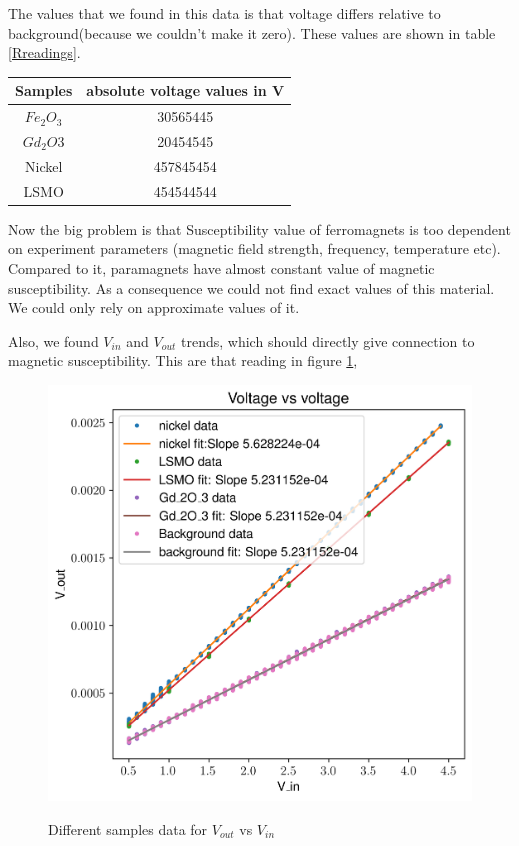 The values that we found in this data is that voltage differs relative to background(because we couldn’t make it zero). These values are shown in table \ref{Rreadings}.

\noindent\setlength\tabcolsep{4pt}%
\begin{tabularx}{\linewidth}{c|c}
  \hline
  \hline
  Samples & absolute voltage values in V \\
  \hline
  $Fe_2O_3$ & 30565445 \\
  $Gd_2O3$ & 20454545 \\
  Nickel & 457845454 \\
LSMO & 454544544 \\
\hline
\hline
\end{tabularx}
\label{Rreadings}
\vskip1cm

Now the big problem is that Susceptibility value of ferromagnets is too dependent on experiment parameters (magnetic field strength, frequency, temperature etc). Compared to it, paramagnets have almost constant value of magnetic susceptibility. As a consequence we could not find exact values of this material. We could only rely on approximate values of it. 

Also, we found $V_{in}$ and $V_{out}$ trends, which should directly give connection to magnetic susceptibility. This are that reading in figure \ref{voltage},

\begin{figure}[hbt!]
  \includegraphics[width= \linewidth]{plots/voltage.png}
  \label{voltage}
  \caption{Different samples data for $V_{out}$ vs $V_{in}$}
\end{figure}

